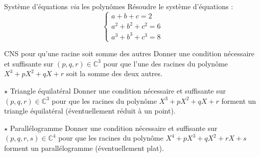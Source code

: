 \documentclass[french,a4paper]{article}
\newcommand{\C}{\mathbb{C}}
\theoremstyle{plain}
\theoremstyle{definition}
\theoremstyle{remark}
\begin{document}
\begin{ex}{Système d'équations \textit{via} les polynômes}
	Résoudre le système d'équations : $$\begin{cases}
		a+b+c=2 \\
		a^2+b^2+c^2=6 \\
		a^3+b^3+c^3=8
	\end{cases}$$
\end{ex}

\begin{ex}{CNS pour qu'une racine soit somme des autres}
	Donner une condition nécessaire et suffisante sur $(p,q,r)\in\C^3$ pour que l'une des racines du polynôme $X^3+pX^2+qX+r$ soit la somme des deux autres.
\end{ex}

\begin{ex}{$\star$ Triangle équilatéral}
	Donner une condition nécessaire et suffisante sur $(p,q,r)\in\C^3$ pour que les racines du polynôme $X^3+pX^2+qX+r$ forment un triangle équilatéral (éventuellement réduit à un point).
\end{ex}

\begin{ex}{$\star$ Parallélogramme}
	Donner une condition nécessaire et suffisante sur $(p,q,r,s)\in\C^4$ pour que les racines du polynôme $X^4+pX^3+qX^2+rX+s$ forment un parallélogramme (éventuellement plat).
\end{ex}
\end{document}
